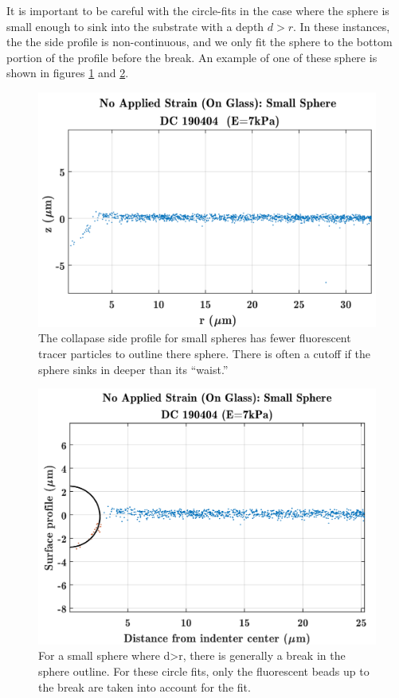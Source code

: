 It is important to be careful with the circle-fits in the case where the sphere is small enough to sink into the substrate with a depth $ d > r $. In these instances, the the side profile is non-continuous, and we only fit the sphere to the bottom portion of the profile before the break. An example of one of these sphere is shown in figures \ref{fig:smallsphere017190404dcglass} and \ref{fig:smallsphere017ciclefitspheredc}.
\begin{figure}[h!]
	\centering
	\includegraphics[width=\linewidth]{Chapters/Figures/smallsphere017_190404_DC_glass}
	\caption[Small Sphere Side Profile]{The collapase side profile for small spheres has fewer fluorescent tracer particles to outline there sphere. There is often a cutoff if the sphere sinks in deeper than its ``waist.''}
	\label{fig:smallsphere017190404dcglass}
\end{figure}
\begin{figure}[h!]
	\centering
	\includegraphics[width=\linewidth]{Chapters/Figures/smallsphere017_cicle_fitsphere_DC}
	\caption[Small Sphere Circle Fit]{For a small sphere where d>r, there is generally a break in the sphere outline. For these circle fits, only the fluorescent beads up to the break are taken into account for the fit.}
	\label{fig:smallsphere017ciclefitspheredc}
\end{figure}




